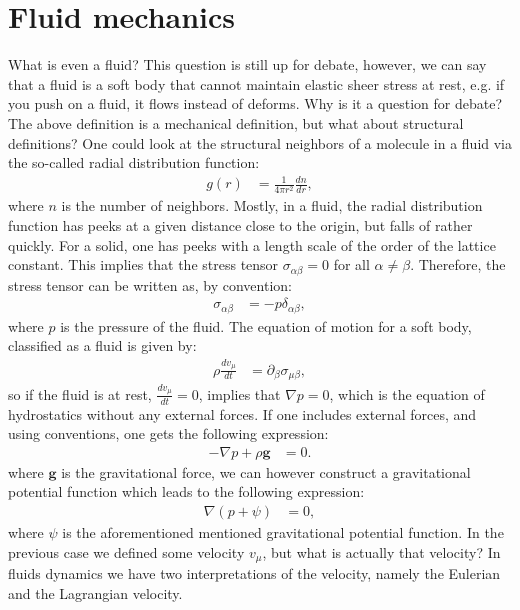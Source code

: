 \documentclass[a4paper]{article}
\begin{document}
\section{Fluid mechanics}\label{sec: Fluid mechanics}
What is even a fluid? This question is still up for debate, however, we can say that a fluid is a soft body that cannot maintain elastic sheer stress at rest, e.g. if you push on a fluid, it flows instead of deforms.
Why is it a question for debate? The above definition is a mechanical definition, but what about structural definitions? One could look at the structural neighbors of a molecule in a fluid via the so-called radial distribution function:
\begin{align*}
    g(r) &= \frac{1}{4\pi r^2}\frac{d n}{dr},
\end{align*}where $n$ is the number of neighbors. Mostly, in a fluid, the radial distribution function has peeks at a given distance close to the origin, but falls of rather quickly. For a solid, one has peeks with a length scale of the order of the lattice constant.
This implies that the stress tensor $\sigma_{\alpha\beta} = 0$ for all $\alpha\neq\beta$. Therefore, the stress tensor can be written as, by convention:
\begin{align*}
    \sigma_{\alpha\beta} &= -p\delta_{\alpha\beta},
\end{align*}where $p$ is the pressure of the fluid. The equation of motion for a soft body, classified as a fluid is given by:
\begin{align}
    \rho\frac{dv_\mu}{dt} &= \partial_\beta\sigma_{\mu\beta},\label{eq: fluid equation of motion}
\end{align}so if the fluid is at rest, $\frac{dv_\mu}{dt} = 0$, implies that $\nabla p = 0$, which is the equation of hydrostatics without any external forces. If one includes external forces, and using conventions, one gets the following expression:
\begin{align}
    -\nabla p + \rho\mathbf{g} &= 0.\label{eq: hydrostatics}
\end{align}where $\mathbf{g}$ is the gravitational force, we can however construct a gravitational potential function which leads to the following expression:
\begin{align*}
    \nabla\left(p + \psi\right) &= 0,
\end{align*}where $\psi$ is the aforementioned mentioned gravitational potential function.
In the previous case we defined some velocity $v_\mu$, but what is actually that velocity? In fluids dynamics we have two interpretations of the velocity, namely the Eulerian and the Lagrangian velocity.
\end{document}
